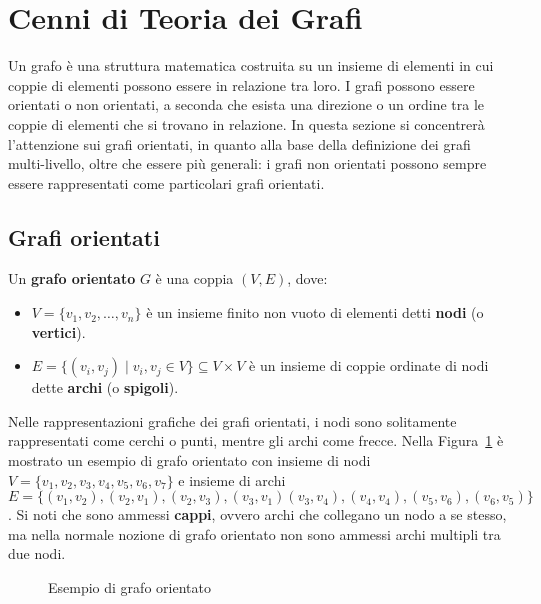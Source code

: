 \section{Cenni di Teoria dei Grafi}\label{sec:cenni-di-teoria-dei-grafi}

Un grafo \`e una struttura matematica costruita su un insieme di elementi in cui coppie di elementi possono essere
in relazione tra loro.
I grafi possono essere orientati o non orientati, a seconda che esista una direzione o un ordine tra le coppie
di elementi che si trovano in relazione.
In questa sezione si concentrerà l'attenzione sui grafi orientati, in quanto alla base della definizione dei
grafi multi-livello, oltre che essere più generali: i grafi non orientati possono sempre essere rappresentati
come particolari grafi orientati.

\subsection{Grafi orientati}\label{subsec:grafi-orientati}

\begin{definition}
    Un \textbf{grafo orientato} $G$ \`e una coppia $(V, E)$, dove:
    \begin{itemize}
        \item $V  = \{v_1, v_2, \ldots, v_n\}$ \`e un insieme finito non vuoto di elementi detti \textbf{nodi}
        (o \textbf{vertici}).
        \item $E = \{(v_i, v_j) \mid v_i, v_j \in V\} \subseteq V \times V$ \`e un insieme di coppie ordinate di
        nodi dette \textbf{archi} (o \textbf{spigoli}).
    \end{itemize}
\end{definition}

Nelle rappresentazioni grafiche dei grafi orientati, i nodi sono solitamente rappresentati
come cerchi o punti, mentre gli archi come frecce.
Nella Figura~\ref{fig:directed-graph-example} \`e mostrato un esempio di grafo orientato con insieme di nodi
$V = \{v_1, v_2, v_3, v_4, v_5, v_6, v_7\}$ e insieme di archi $E = \{(v_1, v_2), (v_2, v_1), (v_2, v_3), (v_3, v_1)
(v_3, v_4), (v_4, v_4), (v_5, v_6), (v_6, v_5)\}$. \newline
Si noti che sono ammessi \textbf{cappi}, ovvero archi che collegano un nodo a se stesso, ma nella normale nozione
di grafo orientato non sono ammessi archi multipli tra due nodi.

\begin{figure}[t]
    \centering
    
    \vspace{-10pt}
    \caption{Esempio di grafo orientato}
    \label{fig:directed-graph-example}
\end{figure}

